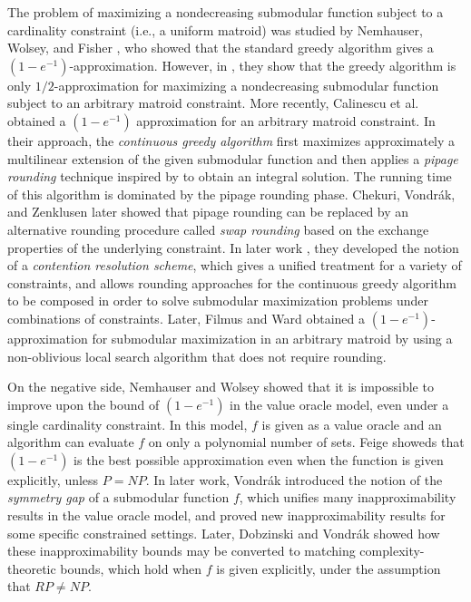 \documentclass{article}
\theoremstyle{definition}
\begin{document}
The problem of maximizing a nondecreasing submodular function subject to a cardinality constraint (i.e., a uniform matroid) was studied by Nemhauser, Wolsey, and Fisher \cite{Nemhauser1978a}, who showed that the standard greedy algorithm gives a $(1 - e^{-1})$-approximation.  However, in \cite{Fisher1978}, they show that the greedy algorithm is only $1/2$-approximation for maximizing a nondecreasing submodular function subject to an arbitrary matroid constraint.  More recently, Calinescu et al. \cite{Calinescu2011} obtained a $(1 - e^{-1})$ approximation for an arbitrary matroid constraint.  In their approach, the \emph{continuous greedy algorithm} first maximizes approximately a multilinear extension of the given submodular function and then applies a \emph{pipage rounding} technique inspired by \cite{Ageev2004} to obtain an integral solution.  The running time of this algorithm is dominated by the pipage rounding phase.  Chekuri, Vondr\'{a}k, and Zenklusen \cite{Chekuri2010} later showed that pipage rounding can be replaced by an alternative rounding procedure called \emph{swap rounding} based on the exchange properties of the underlying constraint.  In later work \cite{Chekuri2011,Chekuri2011a}, they developed the notion of a \emph{contention resolution scheme}, which gives a unified treatment for a variety of constraints, and allows rounding approaches for the continuous greedy algorithm to be composed in order to solve submodular maximization problems under combinations of constraints.  Later, Filmus and Ward \cite{Filmus2012} obtained a $(1 - e^{-1})$-approximation for submodular maximization in an arbitrary matroid by using a non-oblivious local search algorithm that does not require rounding.

On the negative side, Nemhauser and Wolsey \cite{Nemhauser1978} showed that it is impossible to improve upon the bound of $(1 - e^{-1})$ in the value oracle model, even under a single cardinality constraint.  In this model, $f$ is given as a value oracle and an algorithm can evaluate $f$ on only a polynomial number of sets.  Feige \cite{Feige1998} showeds that $(1 - e^{-1})$ is the best possible approximation even when the function is given explicitly, unless $P = NP$.  In later work, Vondr\'{a}k \cite{Vondrak2009} introduced the notion of the \emph{symmetry gap} of a submodular function $f$, which unifies many inapproximability results in the value oracle model, and proved new inapproximability results for some specific constrained settings.  Later, Dobzinski and Vondr\'ak \cite{Dobzinski2012} showed how these inapproximability bounds may be converted to matching complexity-theoretic bounds, which hold when $f$ is given explicitly, under the assumption that $RP \neq NP$.
\end{document}

